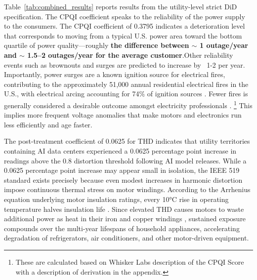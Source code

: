\documentclass[sigconf]{acmart}
\newcommand{\nb}[1]{\textcolor{blue}{NB[#1]}}
\begin{document}
Table~\ref{tab:combined_results} reports results from the utility-level strict DiD specification. The CPQI coefficient speaks to the reliability of the power supply to the consumers. The CPQI coefficient of 0.3795 indicates a deterioration level that corresponds to moving from a typical U.S. power area toward the bottom quartile of power quality—roughly \textbf{the difference between $\sim$ 1 outage/year and $\sim$ 1.5–2 outages/year for the average customer}.Other reliability events such as brownouts and surges are predicted to increase by ~1-2 per year. Importantly, power surges are a known ignition source for electrical fires, contributing to the approximately 51,000 annual residential electrical fires in the U.S., with electrical arcing accounting for 74\% of ignition sources \cite{usfa2019electrical}. Fewer fires is generally considered a desirable outcome amongst electricity professionals \cite{Laughner2024THD}.
\footnote{These are calculated based on Whisker Labs description of the CPQI Score with a description of derivation in the appendix.} This implies more frequent voltage anomalies that make motors and electronics run less efficiently and age faster.



The post-treatment coefficient of 0.0625 for THD indicates that utility territories containing AI data centers experienced a 0.0625 percentage point increase in readings above the 0.8 distortion threshold following AI model releases. 
While a 0.0625 percentage point increase may appear small in isolation, the IEEE 519 standard exists precisely because even modest increases in harmonic distortion impose continuous thermal stress on motor windings. According to the Arrhenius equation underlying motor insulation ratings, every 10°C rise in operating temperature halves insulation life \cite{NEMA_MG1}. Since elevated THD causes motors to waste additional power as heat in their iron and copper windings \cite{Laughner2024THD}, sustained exposure compounds over the multi-year lifespans of household appliances, accelerating degradation of refrigerators, air conditioners, and other motor-driven equipment.
\end{document}
